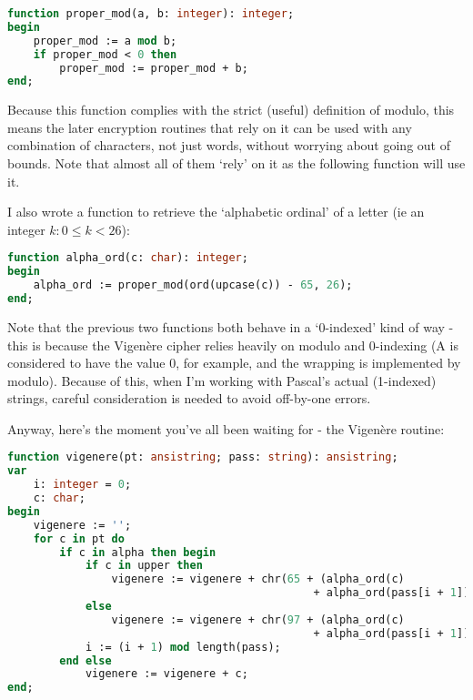 \documentclass{article}
\begin{document}
\begin{lstlisting}[language=Pascal, caption=Proper modulo function]
function proper_mod(a, b: integer): integer;
begin
    proper_mod := a mod b;
    if proper_mod < 0 then
        proper_mod := proper_mod + b;
end;
\end{lstlisting}

    Because this function complies with the strict (useful) definition of
    modulo, this means the later encryption routines that rely on it can be
    used with any combination of characters, not just words, without worrying
    about going out of bounds. Note that almost all of them `rely' on it as the
    following function will use it.

    I also wrote a function to retrieve the `alphabetic ordinal' of a letter
    (ie an integer $k: 0 \leq k < 26$):

\begin{lstlisting}[language=Pascal, caption=Proper modulo function]
function alpha_ord(c: char): integer;
begin
    alpha_ord := proper_mod(ord(upcase(c)) - 65, 26);
end;
\end{lstlisting}

    Note that the previous two functions both behave in a `0-indexed' kind of
    way - this is because the Vigen\`ere cipher relies heavily on modulo and
    0-indexing (A is considered to have the value 0, for example, and the
    wrapping is implemented by modulo). Because of this, when I'm working with
    Pascal's actual (1-indexed) strings, careful consideration is needed to
    avoid off-by-one errors.

    Anyway, here's the moment you've all been waiting for - the Vigen\`ere
    routine:

\begin{lstlisting}[language=Pascal, label={lst:overflowbug}, caption=Vigen\`ere algorithm]
function vigenere(pt: ansistring; pass: string): ansistring;
var
    i: integer = 0;
    c: char;
begin
    vigenere := '';
    for c in pt do
        if c in alpha then begin
            if c in upper then
                vigenere := vigenere + chr(65 + (alpha_ord(c)
                                               + alpha_ord(pass[i + 1])) mod 26)
            else
                vigenere := vigenere + chr(97 + (alpha_ord(c)
                                               + alpha_ord(pass[i + 1])) mod 26);
            i := (i + 1) mod length(pass);
        end else
            vigenere := vigenere + c;
end;
\end{lstlisting}
\end{document}

